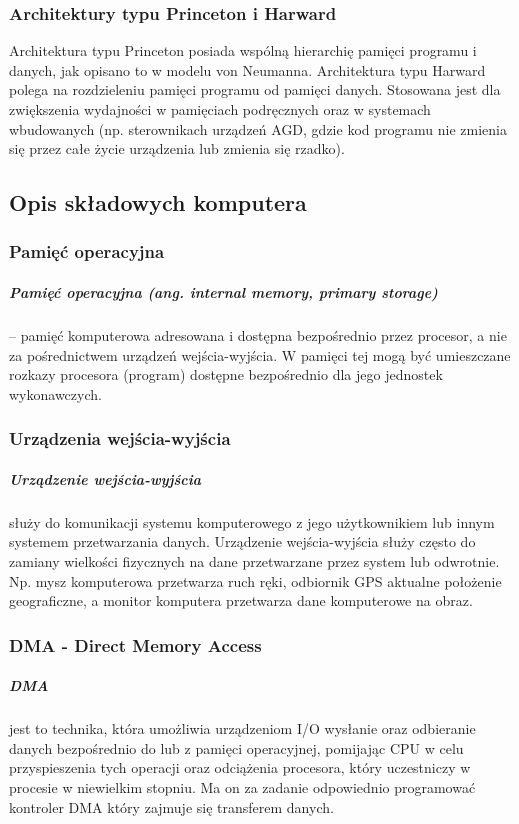 \documentclass[a4paper,twoside]{report}
\begin{document}
\subsubsection{Architektury typu Princeton i Harward}


Architektura typu Princeton posiada wspólną hierarchię pamięci programu i danych, jak opisano to w modelu von
Neumanna. Architektura typu Harward polega na rozdzieleniu pamięci programu od pamięci danych. Stosowana
jest dla zwiększenia wydajności w pamięciach podręcznych oraz w systemach wbudowanych (np. sterownikach
urządzeń AGD, gdzie kod programu nie zmienia się przez całe życie urządzenia lub zmienia się rzadko).

\subsection{Opis składowych komputera}

\subsubsection{Pamięć operacyjna}

\subparagraph{Pamięć operacyjna (ang. internal memory, primary storage)} – pamięć komputerowa adresowana i dostępna bezpośrednio przez procesor, a nie za pośrednictwem urządzeń wejścia-wyjścia. W pamięci tej mogą być umieszczane rozkazy procesora (program) dostępne bezpośrednio dla jego jednostek wykonawczych.

\subsubsection{Urządzenia wejścia-wyjścia} 

\subparagraph{Urządzenie wejścia-wyjścia} służy do komunikacji systemu komputerowego z jego użytkownikiem lub innym systemem przetwarzania danych. Urządzenie wejścia-wyjścia służy często do zamiany wielkości fizycznych na dane przetwarzane przez system lub odwrotnie. Np. mysz komputerowa przetwarza ruch ręki, odbiornik GPS aktualne położenie geograficzne, a monitor komputera przetwarza dane komputerowe na obraz.

\subsubsection{DMA - Direct Memory Access}

\subparagraph{DMA} jest to technika, która umożliwia urządzeniom I/O wysłanie oraz odbieranie danych bezpośrednio do lub z pamięci operacyjnej, pomijając CPU w celu przyspieszenia tych operacji oraz odciążenia procesora, który uczestniczy w procesie w niewielkim stopniu. Ma on za zadanie odpowiednio programować kontroler DMA który zajmuje się transferem danych. 
\end{document}
